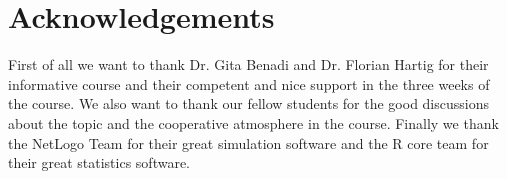 \section*{Acknowledgements}
First of all we want to thank Dr. Gita Benadi and Dr. Florian Hartig for their informative course and their competent and nice support in the three weeks of the course. We also want to thank our fellow students for the good discussions about the topic and the cooperative atmosphere in the course. Finally we thank the NetLogo Team for their great simulation software and  the R core team for their great statistics software.